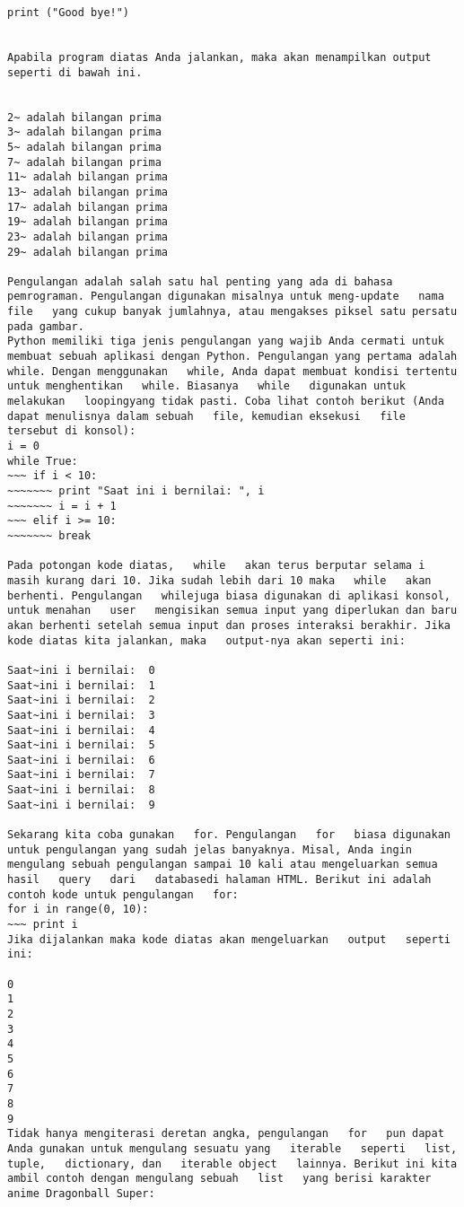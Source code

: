 \begin{verbatim}
print ("Good bye!") 


Apabila program diatas Anda jalankan, maka akan menampilkan output seperti di bawah ini.

 
2~ adalah bilangan prima 
3~ adalah bilangan prima 
5~ adalah bilangan prima 
7~ adalah bilangan prima 
11~ adalah bilangan prima 
13~ adalah bilangan prima 
17~ adalah bilangan prima 
19~ adalah bilangan prima 
23~ adalah bilangan prima 
29~ adalah bilangan prima 

Pengulangan adalah salah satu hal penting yang ada di bahasa pemrograman. Pengulangan digunakan misalnya untuk meng-update   nama   file   yang cukup banyak jumlahnya, atau mengakses piksel satu persatu pada gambar. 
Python memiliki tiga jenis pengulangan yang wajib Anda cermati untuk membuat sebuah aplikasi dengan Python. Pengulangan yang pertama adalah   while. Dengan menggunakan   while, Anda dapat membuat kondisi tertentu untuk menghentikan   while. Biasanya   while   digunakan untuk melakukan   loopingyang tidak pasti. Coba lihat contoh berikut (Anda dapat menulisnya dalam sebuah   file, kemudian eksekusi   file   tersebut di konsol): 
i = 0 
while True: 
~~~ if i < 10: 
~~~~~~~ print "Saat ini i bernilai: ", i 
~~~~~~~ i = i + 1 
~~~ elif i >= 10: 
~~~~~~~ break 

Pada potongan kode diatas,   while   akan terus berputar selama i masih kurang dari 10. Jika sudah lebih dari 10 maka   while   akan berhenti. Pengulangan   whilejuga biasa digunakan di aplikasi konsol, untuk menahan   user   mengisikan semua input yang diperlukan dan baru akan berhenti setelah semua input dan proses interaksi berakhir. Jika kode diatas kita jalankan, maka   output-nya akan seperti ini: 

Saat~ini i bernilai:  0 
Saat~ini i bernilai:  1 
Saat~ini i bernilai:  2 
Saat~ini i bernilai:  3 
Saat~ini i bernilai:  4 
Saat~ini i bernilai:  5 
Saat~ini i bernilai:  6 
Saat~ini i bernilai:  7 
Saat~ini i bernilai:  8 
Saat~ini i bernilai:  9 

Sekarang kita coba gunakan   for. Pengulangan   for   biasa digunakan untuk pengulangan yang sudah jelas banyaknya. Misal, Anda ingin mengulang sebuah pengulangan sampai 10 kali atau mengeluarkan semua hasil   query   dari   databasedi halaman HTML. Berikut ini adalah contoh kode untuk pengulangan   for: 
for i in range(0, 10): 
~~~ print i 
Jika dijalankan maka kode diatas akan mengeluarkan   output   seperti ini: 

0 
1 
2 
3 
4 
5 
6 
7 
8 
9 
Tidak hanya mengiterasi deretan angka, pengulangan   for   pun dapat Anda gunakan untuk mengulang sesuatu yang   iterable   seperti   list,   tuple,   dictionary, dan   iterable object   lainnya. Berikut ini kita ambil contoh dengan mengulang sebuah   list   yang berisi karakter anime Dragonball Super: 


\end{verbatim}
